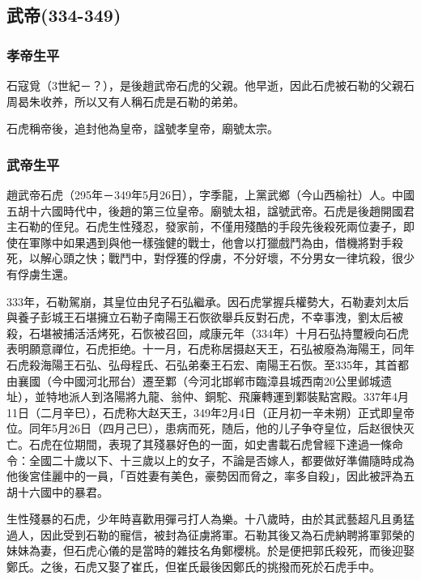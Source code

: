 
\subsection{武帝\tiny(334-349)}

\subsubsection{孝帝生平}

石寇覓（3世紀－？），是後趙武帝石虎的父親。他早逝，因此石虎被石勒的父親石周曷朱收养，所以又有人稱石虎是石勒的弟弟。

石虎稱帝後，追封他為皇帝，諡號孝皇帝，廟號太宗。

\subsubsection{武帝生平}

趙武帝石虎（295年－349年5月26日），字季龍，上黨武鄉（今山西榆社）人。中國五胡十六國時代中，後趙的第三位皇帝。廟號太祖，諡號武帝。石虎是後趙開國君主石勒的侄兒。石虎生性殘忍，發家前，不僅用殘酷的手段先後殺死兩位妻子，即使在軍隊中如果遇到與他一樣強健的戰士，他會以打獵戲鬥為由，借機將對手殺死，以解心頭之快；戰鬥中，對俘獲的俘虜，不分好壞，不分男女一律坑殺，很少有俘虜生還。

333年，石勒駕崩，其皇位由兒子石弘繼承。因石虎掌握兵權勢大，石勒妻刘太后與養子彭城王石堪擁立石勒子南陽王石恢欲舉兵反對石虎，不幸事洩，劉太后被殺，石堪被捕活活烤死，石恢被召回，咸康元年（334年）十月石弘持璽綬向石虎表明願意禪位，石虎拒绝。十一月，石虎称居摄赵天王，石弘被廢為海陽王，同年石虎殺海陽王石弘、弘母程氏、石弘弟秦王石宏、南陽王石恢。至335年，其首都由襄國（今中國河北邢台）遷至鄴（今河北邯郸市臨漳县城西南20公里邺城遗址），並特地派人到洛陽將九龍、翁仲、銅駝、飛廉轉運到鄴裝點宮殿。337年4月11日（二月辛巳），石虎称大赵天王，349年2月4日（正月初一辛未朔）正式即皇帝位。同年5月26日（四月己巳），患病而死，随后，他的儿子争夺皇位，后赵很快灭亡。石虎在位期間，表現了其殘暴好色的一面，如史書載石虎曾經下達過一條命令：全國二十歲以下、十三歲以上的女子，不論是否嫁人，都要做好準備隨時成為他後宮佳麗中的一員，「百姓妻有美色，豪勢因而脅之，率多自殺」，因此被評為五胡十六國中的暴君。

生性殘暴的石虎，少年時喜歡用彈弓打人為樂。十八歲時，由於其武藝超凡且勇猛過人，因此受到石勒的寵信，被封為征虜將軍。石勒其後又為石虎納聘將軍郭榮的妹妹為妻，但石虎心儀的是當時的雜技名角鄭櫻桃。於是便把郭氏殺死，而後迎娶鄭氏。之後，石虎又娶了崔氏，但崔氏最後因鄭氏的挑撥而死於石虎手中。

